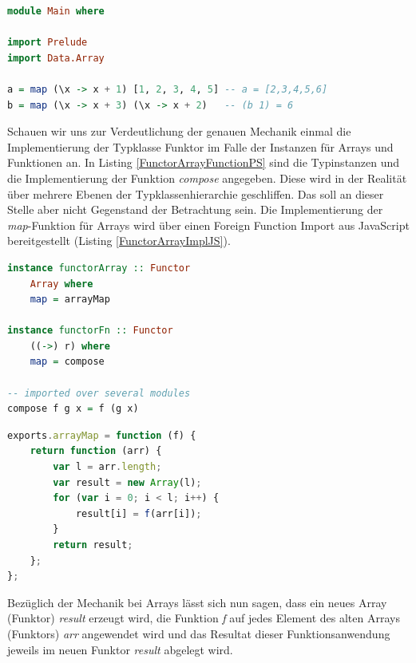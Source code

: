 \documentclass[
12pt,
ngerman,
oneside]
{scrbook} %
\begin{document}
\begin{lstlisting}[language=purescript, style=numbered-and-boxed, caption=Weitere Funktoren in PS, label=FunctorExample2PS]
module Main where

import Prelude
import Data.Array

a = map (\x -> x + 1) [1, 2, 3, 4, 5] -- a = [2,3,4,5,6]
b = map (\x -> x + 3) (\x -> x + 2)   -- (b 1) = 6
\end{lstlisting}

Schauen wir uns zur Verdeutlichung der genauen Mechanik einmal die Implementierung der Typklasse Funktor im Falle der Instanzen für Arrays und Funktionen an. In Listing \ref{FunctorArrayFunctionPS} sind die Typinstanzen und die Implementierung der Funktion \emph{compose} angegeben. Diese wird in der Realität über mehrere Ebenen der Typklassenhierarchie geschliffen. Das soll an dieser Stelle aber nicht Gegenstand der Betrachtung sein. Die Implementierung der \emph{map}-Funktion für Arrays wird über einen Foreign Function Import aus JavaScript bereitgestellt (Listing \ref{FunctorArrayImplJS}).

\noindent\begin{minipage}[t]{.48\textwidth} 
	\hspace*{0pt}\begin{lstlisting}[language=purescript, style=only-rect, caption= Typinstanzen für Arrays und Funktionen PS, label=FunctorArrayFunctionPS]
instance functorArray :: Functor 
	Array where
	map = arrayMap

instance functorFn :: Functor
	((->) r) where
	map = compose

-- imported over several modules
compose f g x = f (g x)	
	\end{lstlisting}
\end{minipage}%
% 
\hfill%
\begin{minipage}[t]{.50\textwidth} 
	\hspace*{0pt}\begin{lstlisting}[language=javascript, style=only-rect, caption= Native JavaScript Impl., label=FunctorArrayImplJS] 
exports.arrayMap = function (f) {
	return function (arr) {
		var l = arr.length;
		var result = new Array(l);
		for (var i = 0; i < l; i++) {
			result[i] = f(arr[i]);
		}
		return result;
	};
};
	\end{lstlisting}
\end{minipage}
\hfill%

Bezüglich der Mechanik bei Arrays lässt sich nun sagen, dass ein neues Array (Funktor) \emph{result} erzeugt wird, die Funktion \emph{f} auf jedes Element des alten Arrays (Funktors) \emph{arr} angewendet wird und das Resultat dieser Funktionsanwendung jeweils im neuen Funktor \emph{result} abgelegt wird. 
\end{document}
